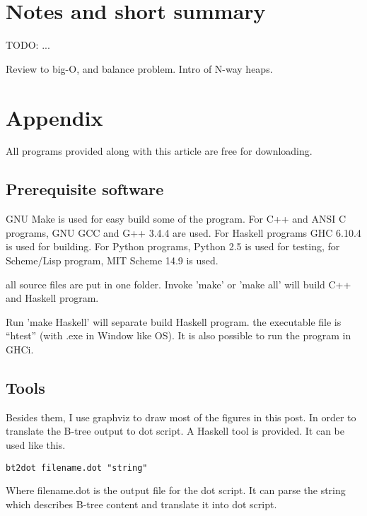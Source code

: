 \documentclass{article}
\begin{document}
\section{Notes and short summary}

TODO: ...

Review to big-O, and balance problem.
Intro of N-way heaps.


\section{Appendix} \label{appendix}
All programs provided along with this article are free for
downloading.

\subsection{Prerequisite software}
GNU Make is used for easy build some of the program. For C++ and ANSI C programs,
GNU GCC and G++ 3.4.4 are used. 
For Haskell programs GHC 6.10.4 is used
for building. For Python programs, Python 2.5 is used for testing, for
Scheme/Lisp program, MIT Scheme 14.9 is used.

all source files are put in one folder. Invoke 'make' or 'make all'
will build C++ and Haskell program. 

Run 'make Haskell' will separate build Haskell program. the executable
file is ``htest'' (with .exe
in Window like OS). It is also possible to run the program in GHCi.

\subsection{Tools}

Besides them, I use graphviz to draw most of the figures in this post. In order to
translate the B-tree output to dot script. A Haskell tool is provided.
It can be used like this.

\begin{verbatim}
bt2dot filename.dot "string"
\end{verbatim}

Where filename.dot is the output file for the dot script. It can
parse the string which describes B-tree content and translate it 
into dot script.
\end{document}
